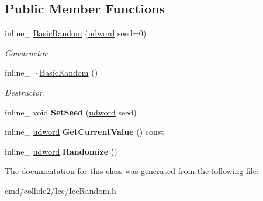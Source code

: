 \subsection*{Public Member Functions}
\begin{DoxyCompactItemize}
\item 
inline\+\_\+ \hyperlink{classBasicRandom_aa0c310555289aaf7331447f9e98acd7f}{Basic\+Random} (\hyperlink{IceTypes_8h_a44c6f1920ba5551225fb534f9d1a1733}{udword} seed=0)\hypertarget{classBasicRandom_aa0c310555289aaf7331447f9e98acd7f}{}\label{classBasicRandom_aa0c310555289aaf7331447f9e98acd7f}

\begin{DoxyCompactList}\small\item\em Constructor. \end{DoxyCompactList}\item 
inline\+\_\+ \hyperlink{classBasicRandom_a2990bcd02ae20f844d2fdf54069f8a45}{$\sim$\+Basic\+Random} ()\hypertarget{classBasicRandom_a2990bcd02ae20f844d2fdf54069f8a45}{}\label{classBasicRandom_a2990bcd02ae20f844d2fdf54069f8a45}

\begin{DoxyCompactList}\small\item\em Destructor. \end{DoxyCompactList}\item 
inline\+\_\+ void {\bfseries Set\+Seed} (\hyperlink{IceTypes_8h_a44c6f1920ba5551225fb534f9d1a1733}{udword} seed)\hypertarget{classBasicRandom_ad6cc026eb6d290c918be4215e87710d7}{}\label{classBasicRandom_ad6cc026eb6d290c918be4215e87710d7}

\item 
inline\+\_\+ \hyperlink{IceTypes_8h_a44c6f1920ba5551225fb534f9d1a1733}{udword} {\bfseries Get\+Current\+Value} () const \hypertarget{classBasicRandom_a9092bbd85517a43a9a5351f888f97561}{}\label{classBasicRandom_a9092bbd85517a43a9a5351f888f97561}

\item 
inline\+\_\+ \hyperlink{IceTypes_8h_a44c6f1920ba5551225fb534f9d1a1733}{udword} {\bfseries Randomize} ()\hypertarget{classBasicRandom_a291834b6e62d7dceb80020cd120c8dbf}{}\label{classBasicRandom_a291834b6e62d7dceb80020cd120c8dbf}

\end{DoxyCompactItemize}


The documentation for this class was generated from the following file\+:\begin{DoxyCompactItemize}
\item 
cmd/collide2/\+Ice/\hyperlink{IceRandom_8h}{Ice\+Random.\+h}\end{DoxyCompactItemize}
